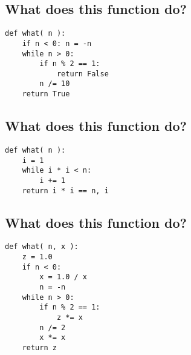 \documentclass[12pt]{article}
\begin{document}
\subsection  {What does this function do?}
  \begin{verbatim}
def what( n ):
    if n < 0: n = -n
    while n > 0:
        if n % 2 == 1:
            return False
        n /= 10
    return True
  \end{verbatim}
\newpage

\subsection{What does this function do?}
\begin{verbatim}
def what( n ):
    i = 1    
    while i * i < n:
        i += 1
    return i * i == n, i
  \end{verbatim}

\subsection{What does this function do?}
  \begin{verbatim}
def what( n, x ):
    z = 1.0
    if n < 0:
        x = 1.0 / x
        n = -n
    while n > 0:
        if n % 2 == 1:
            z *= x
        n /= 2
        x *= x
    return z
  \end{verbatim}
\end{document}
